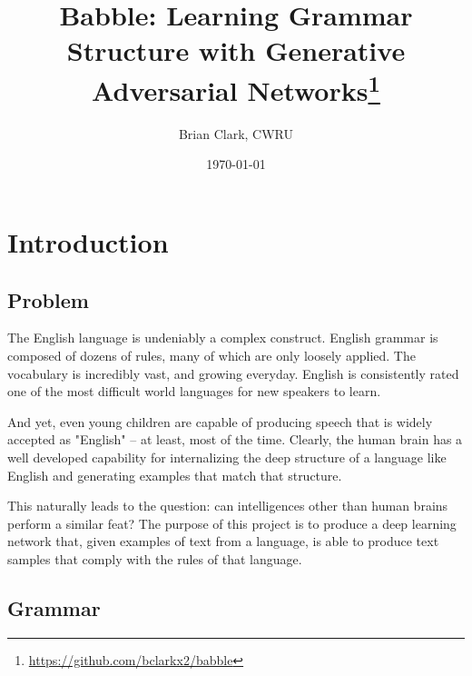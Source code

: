\documentclass[11pt]{article}
\title{Babble: Learning Grammar Structure with Generative Adversarial Networks\thanks{\url{https://github.com/bclarkx2/babble}}}
\author{Brian Clark, CWRU}
\date{\today}
\begin{document}
\maketitle


\newpage
\tableofcontents
\newpage

\section{Introduction}

\subsection{Problem}

The English language is undeniably a complex construct. English grammar is composed of dozens of rules, many of which are only loosely applied. The vocabulary is incredibly vast, and growing everyday. English is consistently rated one of the most difficult world languages for new speakers to learn.

And yet, even young children are capable of producing speech that is widely accepted as "English" -- at least, most of the time. Clearly, the human brain has a well developed capability for internalizing the deep structure of a language like English and generating examples that match that structure.

This naturally leads to the question: can intelligences other than human brains perform a similar feat? The purpose of this project is to produce a deep learning network that, given examples of text from a language, is able to produce text samples that comply with the rules of that language.

\subsection{Grammar}
\end{document}
